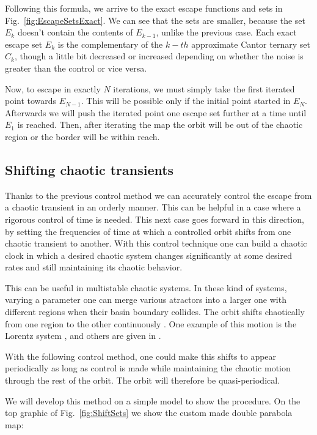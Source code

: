 Following this formula, we arrive to the exact escape functions and sets in Fig.~\ref{fig:EscapeSetsExact}. We can see that the sets are smaller, because the set $E_k$ doesn't contain the contents of $E_{k-1}$, unlike the previous case. Each exact escape set $E_k$ is the complementary of the $k-th$ approximate Cantor ternary set $C_k$, though a little bit decreased or increased depending on whether the noise is greater than the control or vice versa. 

Now, to escape in exactly $N$ iterations, we must simply take the first iterated point towards $E_{N-1}$. This will be possible only if the initial point started in $E_N$. Afterwards we will push the iterated point one escape set further at a time until $E_1$ is reached. Then, after iterating the map the orbit will be out of the chaotic region or the border will be within reach.




\subsection{Shifting chaotic transients}
 

Thanks to the previous control method we can accurately control the escape from a chaotic transient in an orderly manner. This can be helpful in a case where a rigorous control of time is needed. This next case goes forward in this direction, by setting the frequencies of time at which a controlled orbit shifts from one chaotic transient to another. With this control technique one can build a chaotic clock in which a desired chaotic system changes significantly at some desired rates and still maintaining its chaotic behavior. 

This can be useful in multistable chaotic systems. In these kind of systems, varying a parameter one can merge various atractors into a larger one with different regions when their basin boundary collides. The orbit shifts chaotically from one region to the other continuously \cite{Multistable2}. One example of this motion is the Lorentz system \cite{Lorentz}, and others are given in \cite{Multistable2, Multistable3, Multistable4}.

With the following control method, one could make this shifts to appear periodically as long as control is made while maintaining the chaotic motion through the rest of the orbit. The orbit will therefore be quasi-periodical.

We will develop this method on a simple model to show the procedure. On the top graphic of Fig.~\ref{fig:ShiftSets} we show the custom made double parabola map:

